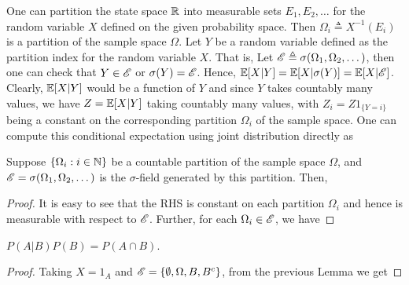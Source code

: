 \documentclass[letterpaper,10pt,english]{article}
\begin{document}
One can partition the state space $\mathbb{R}$ into measurable sets $E_1, E_2, \dots$ for the random variable $X$ defined on the given probability space. 
Then $\Omega_i \triangleq X^{-1}(E_i)$ is a partition of the sample space $\Omega$. 
Let $Y$ be a random variable defined as the partition index for the random variable $X$. 
That is, 
Let $\mathscr{E} \triangleq \sigma(\Omega_1, \Omega_2, \dots)$, then one can check that $Y \in \mathscr{E}$ or $\sigma(Y) = \mathscr{E}$. 
Hence, $\mathbb{E}[X|Y] = \mathbb{E}[X|\sigma(Y)] = \mathbb{E}[X|\mathscr{E}]$. 
Clearly, $\mathbb{E}[X|Y]$ would be a function of $Y$ and since $Y$ takes countably many values, we have $Z = \mathbb{E}[X|Y]$ taking countably many values, with $Z_i = Z1_{\{Y = i\}}$ being a constant on the corresponding partition $\Omega_i$  of the sample space. 
One can compute this conditional expectation using joint distribution directly as 
\begin{lem}
Suppose $\{\Omega_i: i \in \mathbb{N}\}$ be a countable partition of the sample space $\Omega$, and $\mathscr{E} = \sigma(\Omega_1, \Omega_2, \dots)$ is the $\sigma$-field generated by this partition. 
Then, 
\end{lem}
\begin{proof}
It is easy to see that the RHS is constant on each partition $\Omega_i$ and hence is measurable with respect to $\mathscr{E}$. 
Further, for each $\Omega_i \in \mathscr{E}$, we have
\end{proof}
\begin{cor} $P(A|B)P(B) = P(A\cap B)$.
\end{cor}
\begin{proof}
Taking $X = 1_A$ and $\mathscr{E} = \{\emptyset, \Omega, B, B^c\}$, from the previous Lemma we get 
\end{proof}
\end{document}
